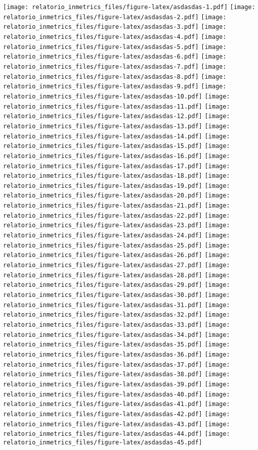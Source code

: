 \documentclass[]{book}
\begin{document}
\texttt{[image: relatorio\_inmetrics\_files/figure-latex/asdasdas-1.pdf]} \texttt{[image: relatorio\_inmetrics\_files/figure-latex/asdasdas-2.pdf]} \texttt{[image: relatorio\_inmetrics\_files/figure-latex/asdasdas-3.pdf]} \texttt{[image: relatorio\_inmetrics\_files/figure-latex/asdasdas-4.pdf]} \texttt{[image: relatorio\_inmetrics\_files/figure-latex/asdasdas-5.pdf]} \texttt{[image: relatorio\_inmetrics\_files/figure-latex/asdasdas-6.pdf]} \texttt{[image: relatorio\_inmetrics\_files/figure-latex/asdasdas-7.pdf]} \texttt{[image: relatorio\_inmetrics\_files/figure-latex/asdasdas-8.pdf]} \texttt{[image: relatorio\_inmetrics\_files/figure-latex/asdasdas-9.pdf]} \texttt{[image: relatorio\_inmetrics\_files/figure-latex/asdasdas-10.pdf]} \texttt{[image: relatorio\_inmetrics\_files/figure-latex/asdasdas-11.pdf]} \texttt{[image: relatorio\_inmetrics\_files/figure-latex/asdasdas-12.pdf]} \texttt{[image: relatorio\_inmetrics\_files/figure-latex/asdasdas-13.pdf]} \texttt{[image: relatorio\_inmetrics\_files/figure-latex/asdasdas-14.pdf]} \texttt{[image: relatorio\_inmetrics\_files/figure-latex/asdasdas-15.pdf]} \texttt{[image: relatorio\_inmetrics\_files/figure-latex/asdasdas-16.pdf]} \texttt{[image: relatorio\_inmetrics\_files/figure-latex/asdasdas-17.pdf]} \texttt{[image: relatorio\_inmetrics\_files/figure-latex/asdasdas-18.pdf]} \texttt{[image: relatorio\_inmetrics\_files/figure-latex/asdasdas-19.pdf]} \texttt{[image: relatorio\_inmetrics\_files/figure-latex/asdasdas-20.pdf]} \texttt{[image: relatorio\_inmetrics\_files/figure-latex/asdasdas-21.pdf]} \texttt{[image: relatorio\_inmetrics\_files/figure-latex/asdasdas-22.pdf]} \texttt{[image: relatorio\_inmetrics\_files/figure-latex/asdasdas-23.pdf]} \texttt{[image: relatorio\_inmetrics\_files/figure-latex/asdasdas-24.pdf]} \texttt{[image: relatorio\_inmetrics\_files/figure-latex/asdasdas-25.pdf]} \texttt{[image: relatorio\_inmetrics\_files/figure-latex/asdasdas-26.pdf]} \texttt{[image: relatorio\_inmetrics\_files/figure-latex/asdasdas-27.pdf]} \texttt{[image: relatorio\_inmetrics\_files/figure-latex/asdasdas-28.pdf]} \texttt{[image: relatorio\_inmetrics\_files/figure-latex/asdasdas-29.pdf]} \texttt{[image: relatorio\_inmetrics\_files/figure-latex/asdasdas-30.pdf]} \texttt{[image: relatorio\_inmetrics\_files/figure-latex/asdasdas-31.pdf]} \texttt{[image: relatorio\_inmetrics\_files/figure-latex/asdasdas-32.pdf]} \texttt{[image: relatorio\_inmetrics\_files/figure-latex/asdasdas-33.pdf]} \texttt{[image: relatorio\_inmetrics\_files/figure-latex/asdasdas-34.pdf]} \texttt{[image: relatorio\_inmetrics\_files/figure-latex/asdasdas-35.pdf]} \texttt{[image: relatorio\_inmetrics\_files/figure-latex/asdasdas-36.pdf]} \texttt{[image: relatorio\_inmetrics\_files/figure-latex/asdasdas-37.pdf]} \texttt{[image: relatorio\_inmetrics\_files/figure-latex/asdasdas-38.pdf]} \texttt{[image: relatorio\_inmetrics\_files/figure-latex/asdasdas-39.pdf]} \texttt{[image: relatorio\_inmetrics\_files/figure-latex/asdasdas-40.pdf]} \texttt{[image: relatorio\_inmetrics\_files/figure-latex/asdasdas-41.pdf]} \texttt{[image: relatorio\_inmetrics\_files/figure-latex/asdasdas-42.pdf]} \texttt{[image: relatorio\_inmetrics\_files/figure-latex/asdasdas-43.pdf]} \texttt{[image: relatorio\_inmetrics\_files/figure-latex/asdasdas-44.pdf]} \texttt{[image: relatorio\_inmetrics\_files/figure-latex/asdasdas-45.pdf]} 
\end{document}
